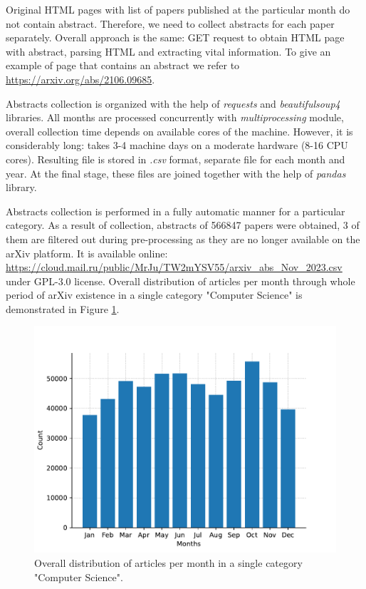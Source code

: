\documentclass{article}
\begin{document}
        Original HTML pages with list of papers published at the particular month do not contain abstract. Therefore, we need to collect abstracts for each paper separately. Overall approach is the same: GET request to obtain HTML page with abstract, parsing HTML and extracting vital information. To give an example of page that contains an abstract we refer to \url{https://arxiv.org/abs/2106.09685}.

        Abstracts collection is organized with the help of \textit{requests} and \textit{beautifulsoup4} libraries. All months are processed concurrently with \textit{multiprocessing} module, overall collection time depends on available cores of the machine. However, it is considerably long: takes 3-4 machine days on a moderate hardware (8-16 CPU cores). Resulting file is stored in \textit{.csv} format, separate file for each month and year. At the final stage, these files are joined together with the help of \textit{pandas} library.

        Abstracts collection is performed in a fully automatic manner for a particular category. As a result of collection, abstracts of 566847 papers were obtained, 3 of them are filtered out during pre-processing as they are no longer available on the arXiv platform. It is available online: \url{https://cloud.mail.ru/public/MrJu/TW2mYSV55/arxiv_abs_Nov_2023.csv} under GPL-3.0 license. Overall distribution of articles per month through whole period of arXiv existence in a single category "Computer Science" is demonstrated in Figure \ref{fig:articles-bars}.

        \begin{figure}[H]
            \centering
            \includegraphics[width=0.99\linewidth]{img/number_of_articles_by_month.pdf}
            \caption{Overall distribution of articles per month in a single category "Computer Science".}
            \label{fig:articles-bars}
        \end{figure}
\end{document}
